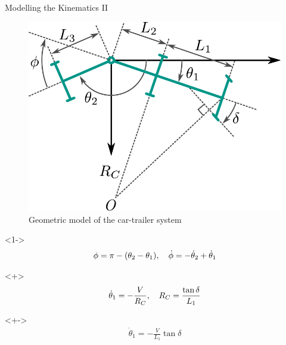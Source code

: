 \begin{frame}{Modelling the Kinematics II}
\begin{minipage}{.4\textwidth}
    \begin{figure}[H]
        \centering
        \includegraphics[width=\textwidth]{images/trailer-diagram}
        \caption{Geometric model of the car-trailer system}
        \label{fig:geom-model}
    \end{figure}
\end{minipage}%
\begin{minipage}{0.55\textwidth}
    \footnotesize
    \begin{onlyenv}<1->
    \begin{align*}
        \phi = \pi - (\theta_{2} - \theta_{1}) \qc
        \dot{\phi} = -\dot{\theta}_{2} + \dot{\theta}_{1} 
    \end{align*}
    \end{onlyenv}
    \begin{onlyenv}<+>
    \begin{align*}
        \dot{\theta}_{1} = -\frac{V}{R_{C}} \qc 
        R_C = \frac{\tan \delta}{L_1}
    \end{align*}
    \end{onlyenv}
    \begin{onlyenv}<+->
    \begin{align*}
        \dot{\theta}_{1} = -\frac{V}{L_{1}} \tan \delta 
    \end{align*}
    \end{onlyenv}

\end{minipage}
\end{frame}
